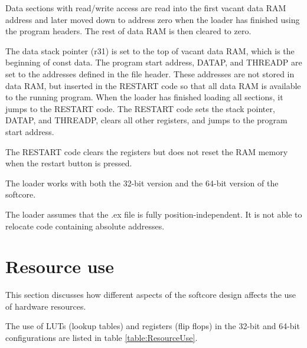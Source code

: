 \documentclass[11pt,a4paper,oneside,openright]{report}
\newcommand{\vv}{ \vspace{2mm} }   %
\begin{document}
Data sections with read/write access are read into the first vacant data RAM address and later moved down to address zero when the loader has finished using the program headers. The rest of data RAM is then cleared to zero.
\vv

The data stack pointer (r31) is set to the top of vacant data RAM, which is the beginning of const data. The program start address, DATAP, and THREADP are set to the addresses defined in the file header. These addresses are not stored in data RAM, but inserted in the RESTART code so that all data RAM is available to the running program. When the loader has finished loading all sections, it jumps to the RESTART code. The RESTART code sets the stack pointer, DATAP, and THREADP, clears all other registers, and jumps to the program start address. 
\vv

The RESTART code clears the registers but does not reset the RAM memory when the restart button is pressed.
\vv

The loader works with both the 32-bit version and the 64-bit version of the softcore.
\vv 

The loader assumes that the .ex file is fully position-independent. It is not able to relocate code containing absolute addresses.
\vv


\section{Resource use}
This section discusses how different aspects of the softcore design affects the use of hardware resources.
\vv

The use of LUTs (lookup tables) and registers (flip flops) in the 32-bit and 64-bit configurations are listed in table \ref{table:ResourceUse}.
\end{document}
